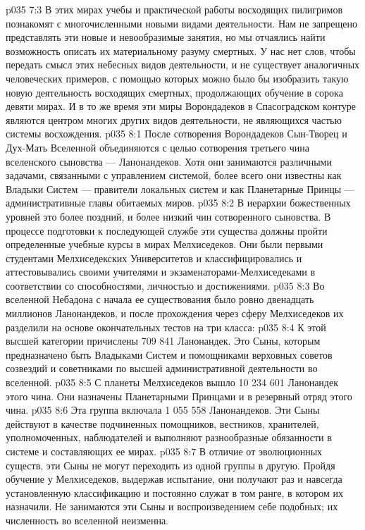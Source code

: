 \vs p035 7:3 В этих мирах учебы и практической работы восходящих пилигримов познакомят с многочисленными новыми видами деятельности. Нам не запрещено представлять эти новые и невообразимые занятия, но мы отчаялись найти возможность описать их материальному разуму смертных. У нас нет слов, чтобы передать смысл этих небесных видов деятельности, и не существует аналогичных человеческих примеров, с помощью которых можно было бы изобразить такую новую деятельность восходящих смертных, продолжающих обучение в сорока девяти мирах. И в то же время эти миры Ворондадеков в Спасоградском контуре являются центром многих других видов деятельности, не являющихся частью системы восхождения.
\vs p035 8:1 После сотворения Ворондадеков Сын\hyp{}Творец и Дух\hyp{}Мать Вселенной объединяются с целью сотворения третьего чина вселенского сыновства --- Ланонандеков. Хотя они занимаются различными задачами, связанными с управлением системой, более всего они известны как Владыки Систем --- правители локальных систем и как Планетарные Принцы --- административные главы обитаемых миров.
\vs p035 8:2 В иерархии божественных уровней это более поздний, и более низкий чин сотворенного сыновства. В процессе подготовки к последующей службе эти существа должны пройти определенные учебные курсы в мирах Мелхиседеков. Они были первыми студентами Мелхиседекских Университетов и классифицировались и аттестовывались своими учителями и экзаменаторами\hyp{}Мелхиседеками в соответствии со способностями, личностью и достижениями.
\vs p035 8:3 Во вселенной Небадона с начала ее существования было ровно двенадцать миллионов Ланонандеков, и после прохождения через сферу Мелхиседеков их разделили на основе окончательных тестов на три класса:
\vs p035 8:4 \bibnobreakspace {} К этой высшей категории причислены 709 841 Ланонандек. Это Сыны, которым предназначено быть Владыками Систем и помощниками верховных советов созвездий и советниками по высшей административной деятельности во вселенной.
\vs p035 8:5 \pc {}\bibnobreakspace {} С планеты Мелхиседеков вышло 10 234 601 Ланонандек этого чина. Они назначены Планетарными Принцами и в резервный отряд этого чина.
\vs p035 8:6 \pc {}\bibnobreakspace {} Эта группа включала 1 055 558 Ланонандеков. Эти Сыны действуют в качестве подчиненных помощников, вестников, хранителей, уполномоченных, наблюдателей и выполняют разнообразные обязанности в системе и составляющих ее мирах.
\vs p035 8:7 \pc В отличие от эволюционных существ, эти Сыны не могут переходить из одной группы в другую. Пройдя обучение у Мелхиседеков, выдержав испытание, они получают раз и навсегда установленную классификацию и постоянно служат в том ранге, в котором их назначили. Не занимаются эти Сыны и воспроизведением себе подобных; их численность во вселенной неизменна.
